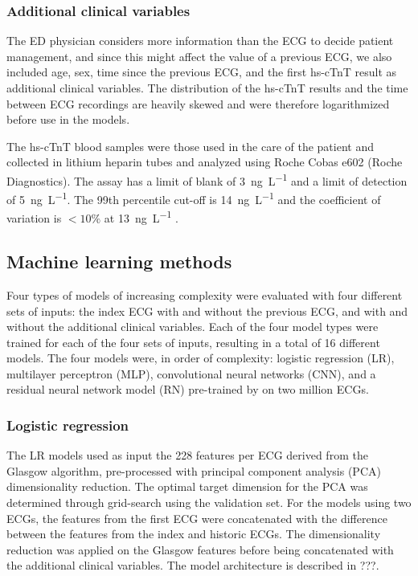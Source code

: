 \documentclass[preprint]{elsarticle}
\begin{document}
\subsubsection{Additional clinical variables}
The ED physician considers more information than the ECG to decide patient management, and since this might affect the value of a previous ECG, we also included age, sex, time since the previous ECG, and the first hs-cTnT result as additional clinical variables. The distribution of the hs-cTnT results and the time between ECG recordings are heavily skewed and were therefore logarithmized before use in the models. 

The hs-cTnT blood samples were those used in the care of the patient and collected in lithium heparin tubes and analyzed using Roche Cobas e602 (Roche Diagnostics). The assay has a limit of blank of \SI{3}{\nano\gram\per\liter} and a limit of detection of \SI{5}{\nano\gram\per\liter}. The 99th percentile cut-off is \SI{14}{\nano\gram\per\liter} and the coefficient of variation is $<10\%$ at \SI{13}{\nano\gram\per\liter} \citep{giannitsis2010}.


\subsection{Machine learning methods}
Four types of models of increasing complexity were evaluated with four different sets of inputs: the index ECG with and without the previous ECG, and with and without the additional clinical variables. Each of the four model types were trained for each of the four sets of inputs, resulting in a total of 16 different models. The four models were, in order of complexity: logistic regression (LR), multilayer perceptron (MLP), convolutional neural networks (CNN), and a residual neural network model (RN) pre-trained by \citet{ribeiro2020} on two million ECGs.

\subsubsection{Logistic regression}
The LR models used as input the 228 features per ECG derived from the Glasgow algorithm, pre-processed with principal component analysis (PCA) dimensionality reduction. The optimal target dimension for the PCA was determined through grid-search using the validation set. For the models using two ECGs, the features from the first ECG were concatenated with the difference between the features from the index and historic ECGs. The dimensionality reduction was applied on the Glasgow features before being concatenated with the additional clinical variables. The model architecture is described in ???.
\end{document}
